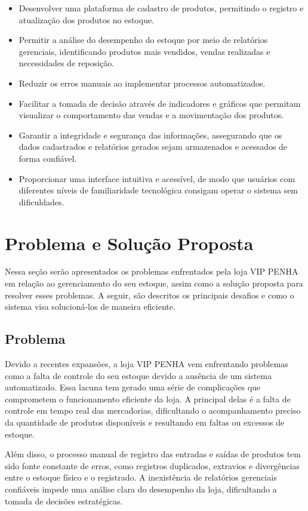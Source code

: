 \documentclass[
	12pt,				%
	openany,			%
	twoside,			%
	a4paper,			%
	english,			%
	brazil				%
	]{abntex2}
\begin{document}
\begin{itemize}
    \item Desenvolver uma plataforma de cadastro de produtos, permitindo o registro e atualização dos produtos no estoque.
    \item Permitir a análise do desempenho do estoque por meio de relatórios gerenciais, identificando produtos mais vendidos, vendas realizadas e necessidades de reposição.
    \item Reduzir os erros manuais ao implementar processos automatizados.
    \item Facilitar a tomada de decisão através de indicadores e gráficos que permitam visualizar o comportamento das vendas e a movimentação dos produtos.
    \item Garantir a integridade e segurança das informações, assegurando que os dados cadastrados e relatórios gerados sejam armazenados e acessados de forma confiável.
    \item Proporcionar uma interface intuitiva e acessível, de modo que usuários com diferentes níveis de familiaridade tecnológica consigam operar o sistema sem dificuldades.
\end{itemize}

\section{Problema e Solução Proposta}

Nessa seção serão apresentados os problemas enfrentados pela loja VIP PENHA em relação ao gerenciamento do seu estoque, assim como a solução proposta para resolver esses problemas. A seguir, são descritos os principais desafios e como o sistema visa solucioná-los de maneira eficiente.

\subsection{Problema}

Devido a recentes expansões, a loja VIP PENHA vem enfrentando problemas como a falta de controle do seu estoque devido a ausência de um sistema automatizado. Essa lacuna tem gerado uma série de complicações que comprometem o funcionamento eficiente da loja. A principal delas é a falta de controle em tempo real das mercadorias, dificultando o acompanhamento preciso da quantidade de produtos disponíveis e resultando em faltas ou excessos de estoque.

Além disso, o processo manual de registro das entradas e saídas de produtos tem sido fonte constante de erros, como registros duplicados, extravios e divergências entre o estoque físico e o registrado. A inexistência de relatórios gerenciais confiáveis impede uma análise clara do desempenho da loja, dificultando a tomada de decisões estratégicas.
\end{document}
